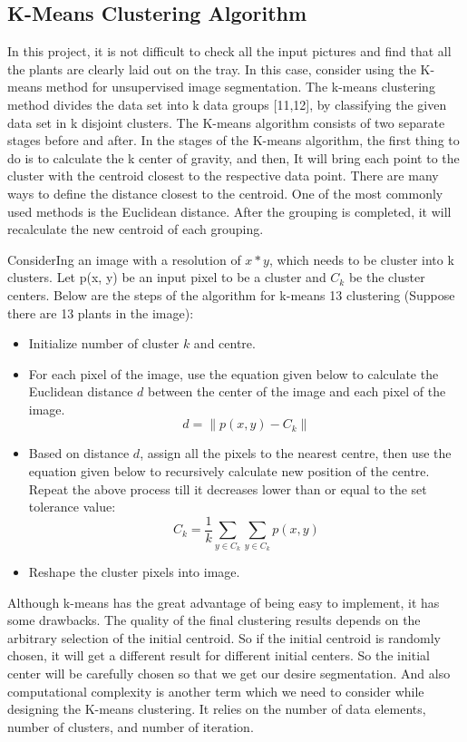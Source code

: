 \documentclass[conference]{IEEEtran}
\begin{document}
\subsection{K-Means Clustering Algorithm}
In this project, it is not difficult to check all the input pictures and find that all the plants are clearly laid out on the tray.
In this case, consider using the K-means method for unsupervised image segmentation.
The k-means clustering method divides the data set into k data groups [11,12], by classifying the given data set in k disjoint clusters.
The K-means algorithm consists of two separate stages before and after. In the stages of the K-means algorithm, the first thing to do is to calculate the k center of gravity, and then,
It will bring each point to the cluster with the centroid closest to the respective data point. 
There are many ways to define the distance closest to the centroid. 
One of the most commonly used methods is the Euclidean distance. 
After the grouping is completed, it will recalculate the new centroid of each grouping.

ConsiderIng an image with a resolution of $x*y$, which needs to be cluster into k clusters. 
Let p(x, y) be an input pixel to be a cluster and $C_{k}$ be the cluster centers. 
Below are the steps of the algorithm for k-means 13 clustering (Suppose there are 13 plants in the image):
\begin{itemize}
\item Initialize number of cluster $k$ and centre.
\item For each pixel of the image, use the equation given below to calculate the Euclidean distance $ d $ between the center of the image and each pixel of the image.
\begin{equation}
d = \| p(x,y) - C_{k} \| 
\end{equation}
\item Based on distance $d$, assign all the pixels to the nearest centre, 
then use the equation given below to recursively calculate new position of the centre.
Repeat the above process till it decreases lower than or equal to the set tolerance value:
\begin{equation}
 C_{k} = {\frac{1}{k}} {\sum\limits_{y \in C_{k}}} {\sum\limits_{y \in C_{k}}} p(x,y)
\end{equation}
\item Reshape the cluster pixels into image.
\end{itemize}

Although k-means has the great advantage of being easy to implement, it has some drawbacks. 
The quality of the final clustering results depends on the arbitrary selection of the initial centroid. 
So if the initial centroid is randomly chosen, it will get a different result for different initial centers. 
So the initial center will be carefully chosen so that we get our desire segmentation. 
And also computational complexity is another term which we need to consider while designing the K-means clustering. 
It relies on the number of data elements, number of clusters, and number of iteration.
\end{document}
